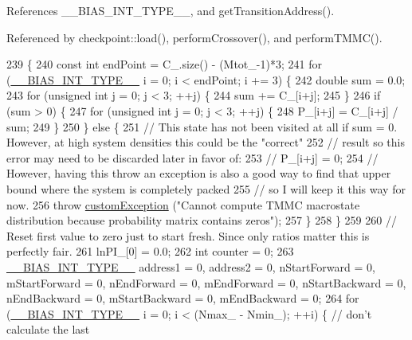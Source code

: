 References \-\_\-\-\_\-\-B\-I\-A\-S\-\_\-\-I\-N\-T\-\_\-\-T\-Y\-P\-E\-\_\-\-\_\-, and get\-Transition\-Address().



Referenced by checkpoint\-::load(), perform\-Crossover(), and perform\-T\-M\-M\-C().


\begin{DoxyCode}
239                         \{
240     \textcolor{keyword}{const} \textcolor{keywordtype}{int} endPoint = C\_.size() - (Mtot\_-1)*3;
241     \textcolor{keywordflow}{for} (\hyperlink{bias_8h_a1ceb524363fcb94da0c64d297ea27438}{\_\_BIAS\_INT\_TYPE\_\_} i = 0; i < endPoint; i += 3) \{
242         \textcolor{keywordtype}{double} sum = 0.0;
243         \textcolor{keywordflow}{for} (\textcolor{keywordtype}{unsigned} \textcolor{keywordtype}{int} j = 0; j < 3; ++j) \{
244             sum += C\_[i+j];
245         \}
246         \textcolor{keywordflow}{if} (sum > 0) \{
247             \textcolor{keywordflow}{for} (\textcolor{keywordtype}{unsigned} \textcolor{keywordtype}{int} j = 0; j < 3; ++j) \{
248                 P\_[i+j] = C\_[i+j] / sum;
249             \}
250         \} \textcolor{keywordflow}{else} \{
251             \textcolor{comment}{// This state has not been visited at all if sum = 0.  However, at high system densities this
       could be the "correct"}
252             \textcolor{comment}{// result so this error may need to be discarded later in favor of:}
253             \textcolor{comment}{// P\_[i+j] = 0;}
254             \textcolor{comment}{// However, having this throw an exception is also a good way to find that upper bound where
       the system is completely packed}
255             \textcolor{comment}{// so I will keep it this way for now.}
256             \textcolor{keywordflow}{throw} \hyperlink{classcustom_exception}{customException} (\textcolor{stringliteral}{"Cannot compute TMMC macrostate distribution because
       probability matrix contains zeros"});
257         \}
258     \}
259 
260     \textcolor{comment}{// Reset first value to zero just to start fresh. Since only ratios matter this is perfectly fair.}
261     lnPI\_[0] = 0.0;
262     \textcolor{keywordtype}{int} counter = 0;
263     \hyperlink{bias_8h_a1ceb524363fcb94da0c64d297ea27438}{\_\_BIAS\_INT\_TYPE\_\_} address1 = 0, address2 = 0, nStartForward = 0, mStartForward = 0, 
      nEndForward = 0, mEndForward = 0, nStartBackward = 0, nEndBackward = 0, mStartBackward = 0, mEndBackward = 0;
264     \textcolor{keywordflow}{for} (\hyperlink{bias_8h_a1ceb524363fcb94da0c64d297ea27438}{\_\_BIAS\_INT\_TYPE\_\_} i = 0; i < (Nmax\_ - Nmin\_); ++i) \{ \textcolor{comment}{// don't calculate the last
}
\end{DoxyCode}
